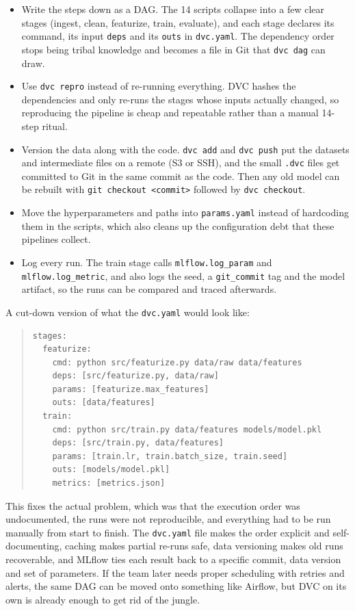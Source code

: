 \documentclass[11pt,a4paper]{article}
\begin{document}
\begin{itemize}
\setlength{\itemsep}{2pt}
\item Write the steps down as a DAG. The 14 scripts collapse into a few clear stages (ingest, clean,
featurize, train, evaluate), and each stage declares its command, its input \texttt{deps} and its
\texttt{outs} in \texttt{dvc.yaml}. The dependency order stops being tribal knowledge and becomes a
file in Git that \texttt{dvc dag} can draw.
\item Use \texttt{dvc repro} instead of re-running everything. DVC hashes the dependencies and only
re-runs the stages whose inputs actually changed, so reproducing the pipeline is cheap and repeatable
rather than a manual 14-step ritual.
\item Version the data along with the code. \texttt{dvc add} and \texttt{dvc push} put the datasets and
intermediate files on a remote (S3 or SSH), and the small \texttt{.dvc} files get committed to Git in
the same commit as the code. Then any old model can be rebuilt with \texttt{git checkout <commit>}
followed by \texttt{dvc checkout}.
\item Move the hyperparameters and paths into \texttt{params.yaml} instead of hardcoding them in the
scripts, which also cleans up the configuration debt that these pipelines collect.
\item Log every run. The train stage calls \texttt{mlflow.log\_param} and \texttt{mlflow.log\_metric},
and also logs the seed, a \texttt{git\_commit} tag and the model artifact, so the runs can be compared
and traced afterwards.
\end{itemize}

A cut-down version of what the \texttt{dvc.yaml} would look like:

\begin{quote}
\begin{footnotesize}
\begin{verbatim}
stages:
  featurize:
    cmd: python src/featurize.py data/raw data/features
    deps: [src/featurize.py, data/raw]
    params: [featurize.max_features]
    outs: [data/features]
  train:
    cmd: python src/train.py data/features models/model.pkl
    deps: [src/train.py, data/features]
    params: [train.lr, train.batch_size, train.seed]
    outs: [models/model.pkl]
    metrics: [metrics.json]
\end{verbatim}
\end{footnotesize}
\end{quote}

This fixes the actual problem, which was that the execution order was undocumented, the runs were not
reproducible, and everything had to be run manually from start to finish. The \texttt{dvc.yaml} file
makes the order explicit and self-documenting, caching makes partial re-runs safe, data versioning
makes old runs recoverable, and MLflow ties each result back to a specific commit, data version and set
of parameters. If the team later needs proper scheduling with retries and alerts, the same DAG can be
moved onto something like Airflow, but DVC on its own is already enough to get rid of the jungle.
\end{document}
